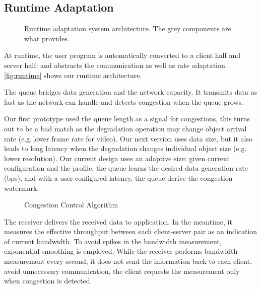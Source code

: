 \subsection{Runtime Adaptation}
\label{sec:adaptation}

\begin{figure}
  \centering
  \resizebox{\columnwidth}{!}{
    
  }
  \caption{Runtime adaptation system architecture. The grey components are what
    \sysname{} provides.}
  \label{fig:runtime}
\end{figure}

At runtime, the user program is automatically converted to a client half and
server half; and \sysname{} abstracts the communication as well as rate
adaptation. \autoref{fig:runtime} shows our runtime architecture.

 The queue bridges data generation and
the network capacity. It transmits data as fast as the network can handle and
detects congestion when the queue grows.

 Our first prototype used the queue length as a
signal for congestions, this turns out to be a bad match as the degradation
operation may change object arrival rate (e.g.\,lower frame rate for video). Our
next version uses data size, but it also leads to long latency when the
degradation changes individual object size (e.g.\,lower resolution). Our current
design uses an adaptive size: given current configuration and the profile, the
queue learns the desired data generation rate (bps), and with a user configured
latency, the queue derive the congestion watermark.

\begin{figure}
  \centering
  \resizebox{\columnwidth}{!}{
    
  }
  \caption{Congestion Control Algorithm}
  \label{fig:cc}
\end{figure}

 The receiver delivers the received data to
application. In the meantime, it measures the effective throughput between each
client-server pair as an indication of current bandwidth. To avoid spikes in the
bandwidth measurement, exponential smoothing is employed. While the receiver
performs bandwidth measurement every second, it does not send the information
back to each client.  avoid unnecessary communication, the client requests the
measurement only when congestion is detected.


